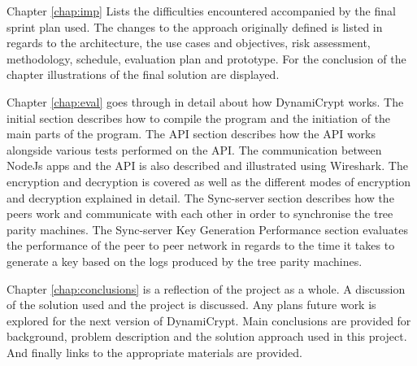 Chapter \ref{chap:imp} Lists the difficulties encountered accompanied by the final sprint plan used. The changes to the approach originally defined is listed in regards to the architecture, the use cases and objectives, risk assessment, methodology, schedule, evaluation plan and prototype. For the conclusion of the chapter illustrations of the final solution are displayed.

Chapter \ref{chap:eval} goes through in detail about how DynamiCrypt works. The initial section describes how to compile the program and the initiation of the main parts of the program. The API section describes how the API works alongside various tests performed on the API. The communication between NodeJs apps and the API is also described and illustrated using Wireshark. The encryption and decryption is covered as well as the different modes of encryption and decryption explained in detail. The Sync-server section describes how the peers work and communicate with each other in order to synchronise the tree parity machines. The Sync-server Key Generation Performance section evaluates the performance of the peer to peer network in regards to the time it takes to generate a key based on the logs produced by the tree parity machines.

Chapter \ref{chap:conclusions} is a reflection of the project as a whole. A discussion of the solution used and the project is discussed. Any plans future work is explored for the next version of DynamiCrypt. Main conclusions are provided for background, problem description and the solution approach used in this project. And finally links to the appropriate materials are provided.
